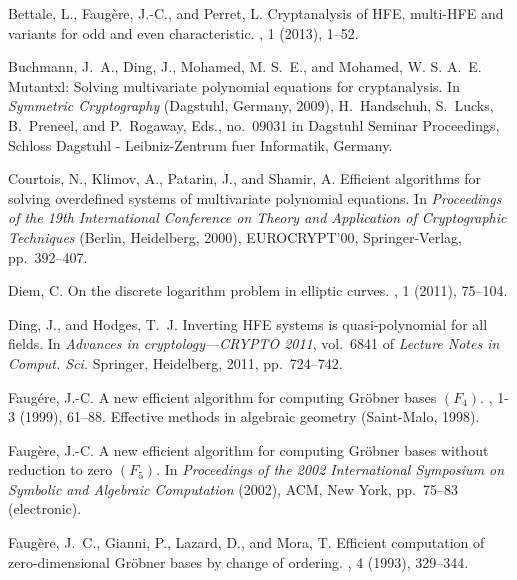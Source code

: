 \documentclass{amsart}
\theoremstyle{plain}
\theoremstyle{definition}
\begin{document}
\begin{thebibliography}{10}

{\sc Bettale, L., Faug{\`e}re, J.-C., and Perret, L.}
\newblock Cryptanalysis of {HFE}, multi-{HFE} and variants for odd and even
  characteristic.
, 1 (2013), 1--52.

{\sc Buchmann, J.~A., Ding, J., Mohamed, M. S.~E., and Mohamed, W. S. A.~E.}
\newblock Mutantxl: Solving multivariate polynomial equations for
  cryptanalysis.
\newblock In {\em Symmetric Cryptography\/} (Dagstuhl, Germany, 2009),
  H.~Handschuh, S.~Lucks, B.~Preneel, and P.~Rogaway, Eds., no.~09031 in
  Dagstuhl Seminar Proceedings, Schloss Dagstuhl - Leibniz-Zentrum fuer
  Informatik, Germany.

{\sc Courtois, N., Klimov, A., Patarin, J., and Shamir, A.}
\newblock Efficient algorithms for solving overdefined systems of multivariate
  polynomial equations.
\newblock In {\em Proceedings of the 19th International Conference on Theory
  and Application of Cryptographic Techniques\/} (Berlin, Heidelberg, 2000),
  EUROCRYPT'00, Springer-Verlag, pp.~392--407.

{\sc Diem, C.}
\newblock On the discrete logarithm problem in elliptic curves.
, 1 (2011), 75--104.

{\sc Ding, J., and Hodges, T.~J.}
\newblock Inverting {HFE} systems is quasi-polynomial for all fields.
\newblock In {\em Advances in cryptology---{CRYPTO} 2011}, vol.~6841 of {\em
  Lecture Notes in Comput. Sci.} Springer, Heidelberg, 2011, pp.~724--742.

{\sc Faug{\'e}re, J.-C.}
\newblock A new efficient algorithm for computing {G}r\"obner bases {$(F_4)$}.
, 1-3 (1999), 61--88.
\newblock Effective methods in algebraic geometry (Saint-Malo, 1998).

{\sc Faug{\`e}re, J.-C.}
\newblock A new efficient algorithm for computing {G}r\"obner bases without
  reduction to zero {$(F_5)$}.
\newblock In {\em Proceedings of the 2002 {I}nternational {S}ymposium on
  {S}ymbolic and {A}lgebraic {C}omputation\/} (2002), ACM, New York, pp.~75--83
  (electronic).

{\sc Faug{\`e}re, J.~C., Gianni, P., Lazard, D., and Mora, T.}
\newblock Efficient computation of zero-dimensional {G}r\"obner bases by change
  of ordering.
, 4 (1993), 329--344.


\end{thebibliography}
\end{document}

